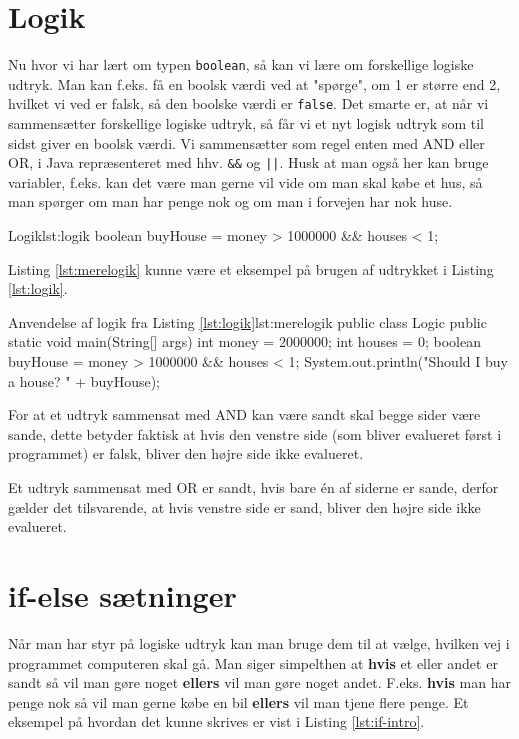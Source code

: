 
\section{Logik}
Nu hvor vi har lært om typen \texttt{boolean}, så kan vi lære om forskellige logiske udtryk. Man kan f.eks. få en boolsk værdi ved at "spørge", om 1 er større end 2, hvilket vi ved er falsk, så den boolske værdi er \texttt{false}. Det smarte er, at når vi sammensætter forskellige logiske udtryk, så får vi et nyt logisk udtryk som til sidst giver en boolsk værdi. Vi sammensætter som regel enten med AND eller OR, i Java repræsenteret med hhv. \texttt{\&\&} og \texttt{||}. Husk at man også her kan bruge variabler, f.eks. kan det være man gerne vil vide om man skal købe et hus, så man spørger om man har penge nok og om man i forvejen har nok huse. 

\begin{JavaCode}{Logik}{lst:logik}
	boolean buyHouse = money > 1000000 && houses < 1;
\end{JavaCode}

Listing \ref{lst:merelogik} kunne være et eksempel på brugen af udtrykket i Listing \ref{lst:logik}.

\begin{JavaCode}{Anvendelse af logik fra Listing \ref{lst:logik}}{lst:merelogik}
	public class Logic {
		public static void main(String[] args) {
			int money = 2000000;
			int houses = 0;
			boolean buyHouse = money > 1000000 && houses < 1;
			System.out.println("Should I buy a house? " + buyHouse);
		}
	}
\end{JavaCode}

\begin{remark}
	For at et udtryk sammensat med AND kan være sandt skal begge sider være sande, dette betyder faktisk at hvis den venstre side (som bliver evalueret først i programmet) er falsk, bliver den højre side ikke evalueret.
	
	Et udtryk sammensat med OR er sandt, hvis bare én af siderne er sande, derfor gælder det tilsvarende, at hvis venstre side er sand, bliver den højre side ikke evalueret.
\end{remark}

\section{if-else sætninger}
Når man har styr på logiske udtryk kan man bruge dem til at vælge, hvilken vej i programmet computeren skal gå. Man siger simpelthen at \textbf{hvis} et eller andet er sandt så vil man gøre noget \textbf{ellers} vil man gøre noget andet. F.eks. \textbf{hvis} man har penge nok så vil man gerne købe en bil \textbf{ellers} vil man tjene flere penge. Et eksempel på hvordan det kunne skrives er vist i Listing \ref{lst:if-intro}.

